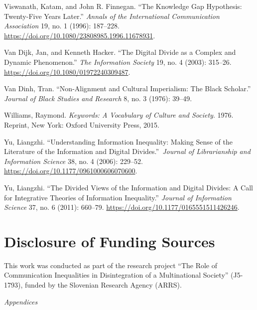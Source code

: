 \documentclass{tufte-handout}
\begin{document}
\begin{hangparas}{.25in}{1}
Viswanath, Katam, and John R. Finnegan. ``The Knowledge Gap Hypothesis:
Twenty-Five Years Later.'' \emph{Annals of the International
Communication Association} 19, no. 1 (1996): 187--228.
\url{https://doi.org/10.1080/23808985.1996.11678931}.

Van Dijk, Jan, and Kenneth Hacker. ``The Digital Divide as a Complex and
Dynamic Phenomenon.'' \emph{The Information Society} 19, no. 4 (2003):
315--26. \url{https://doi.org/10.1080/01972240309487}.

Van Dinh, Tran. ``Non-Alignment and Cultural Imperialism: The Black
Scholar.'' \emph{Journal of Black Studies and Research} 8, no. 3 (1976):
39--49.

Williams, Raymond. \emph{Keywords: A Vocabulary of Culture and Society}.
1976. Reprint, New York: Oxford University Press, 2015.

Yu, Liangzhi. ``Understanding Information Inequality: Making Sense of
the Literature of the Information and Digital Divides.''~\emph{Journal
of Librarianship and Information Science} 38, no. 4 (2006): 229--52.
\url{https://doi.org/10.1177/0961000606070600}.

Yu, Liangzhi. ``The Divided Views of the Information and Digital
Divides: A Call for Integrative Theories of Information Inequality.''
\emph{Journal of Information Science} 37, no. 6 (2011): 660--79.
\url{https://doi.org/10.1177/0165551511426246}.

\vspace*{2em}

\hypertarget{disclosure-of-funding-sources}{%
\section{Disclosure of Funding
Sources}\label{disclosure-of-funding-sources}}

This work was conducted as part of the research project ``The Role of
Communication Inequalities in Disintegration of a Multinational
Society'' (J5-1793), funded by the Slovenian Research Agency (ARRS).

\newpage

\vspace*{4em}

\begin{center}
    

\noindent\huge{\textit{Appendices}}

\end{center}



\vspace*{3em}




\end{hangparas}
\end{document}
